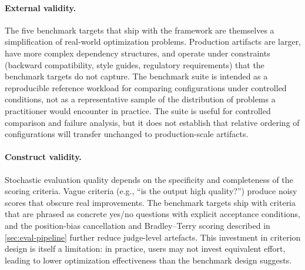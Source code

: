 \paragraph{External validity.}
The five benchmark targets that ship with the framework are themselves a simplification of real-world optimization problems.
Production artifacts are larger, have more complex dependency structures, and operate under constraints (backward compatibility, style guides, regulatory requirements) that the benchmark targets do not capture.
The benchmark suite is intended as a reproducible reference workload for comparing configurations under controlled conditions, not as a representative sample of the distribution of problems a practitioner would encounter in practice.
The suite is useful for controlled comparison and failure analysis, but it does not establish that relative ordering of configurations will transfer unchanged to production-scale artifacts.

\paragraph{Construct validity.}
Stochastic evaluation quality depends on the specificity and completeness of the scoring criteria.
Vague criteria (e.g., ``is the output high quality?'') produce noisy scores that obscure real improvements.
The benchmark targets ship with criteria that are phrased as concrete yes/no questions with explicit acceptance conditions, and the position-bias cancellation and Bradley--Terry scoring described in \cref{sec:eval-pipeline} further reduce judge-level artefacts.
This investment in criterion design is itself a limitation: in practice, users may not invest equivalent effort, leading to lower optimization effectiveness than the benchmark design suggests.

